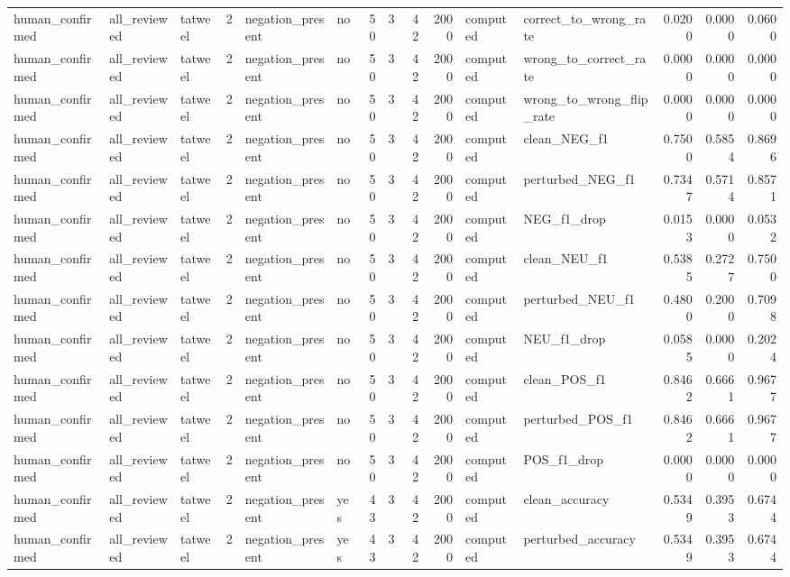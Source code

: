 \begin{tabular}{lllrllrrrrllrrr}
human_confirmed & all_reviewed & tatweel & 2 & negation_present & no & 50 & 3 & 42 & 2000 & computed & correct_to_wrong_rate & 0.0200 & 0.0000 & 0.0600 \\
human_confirmed & all_reviewed & tatweel & 2 & negation_present & no & 50 & 3 & 42 & 2000 & computed & wrong_to_correct_rate & 0.0000 & 0.0000 & 0.0000 \\
human_confirmed & all_reviewed & tatweel & 2 & negation_present & no & 50 & 3 & 42 & 2000 & computed & wrong_to_wrong_flip_rate & 0.0000 & 0.0000 & 0.0000 \\
human_confirmed & all_reviewed & tatweel & 2 & negation_present & no & 50 & 3 & 42 & 2000 & computed & clean_NEG_f1 & 0.7500 & 0.5854 & 0.8696 \\
human_confirmed & all_reviewed & tatweel & 2 & negation_present & no & 50 & 3 & 42 & 2000 & computed & perturbed_NEG_f1 & 0.7347 & 0.5714 & 0.8571 \\
human_confirmed & all_reviewed & tatweel & 2 & negation_present & no & 50 & 3 & 42 & 2000 & computed & NEG_f1_drop & 0.0153 & 0.0000 & 0.0532 \\
human_confirmed & all_reviewed & tatweel & 2 & negation_present & no & 50 & 3 & 42 & 2000 & computed & clean_NEU_f1 & 0.5385 & 0.2727 & 0.7500 \\
human_confirmed & all_reviewed & tatweel & 2 & negation_present & no & 50 & 3 & 42 & 2000 & computed & perturbed_NEU_f1 & 0.4800 & 0.2000 & 0.7098 \\
human_confirmed & all_reviewed & tatweel & 2 & negation_present & no & 50 & 3 & 42 & 2000 & computed & NEU_f1_drop & 0.0585 & 0.0000 & 0.2024 \\
human_confirmed & all_reviewed & tatweel & 2 & negation_present & no & 50 & 3 & 42 & 2000 & computed & clean_POS_f1 & 0.8462 & 0.6661 & 0.9677 \\
human_confirmed & all_reviewed & tatweel & 2 & negation_present & no & 50 & 3 & 42 & 2000 & computed & perturbed_POS_f1 & 0.8462 & 0.6661 & 0.9677 \\
human_confirmed & all_reviewed & tatweel & 2 & negation_present & no & 50 & 3 & 42 & 2000 & computed & POS_f1_drop & 0.0000 & 0.0000 & 0.0000 \\
human_confirmed & all_reviewed & tatweel & 2 & negation_present & yes & 43 & 3 & 42 & 2000 & computed & clean_accuracy & 0.5349 & 0.3953 & 0.6744 \\
human_confirmed & all_reviewed & tatweel & 2 & negation_present & yes & 43 & 3 & 42 & 2000 & computed & perturbed_accuracy & 0.5349 & 0.3953 & 0.6744 \\

\end{tabular}
